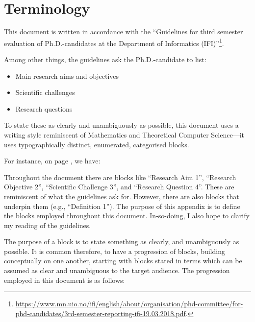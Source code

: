 \section{Terminology}\label{app:terminology}

This document is written in accordance with the ``Guidelines for third
semester evaluation of Ph.D.-candidates at the Department of
Informatics
(IFI)''\footnote{\url{https://www.mn.uio.no/ifi/english/about/organisation/phd-committee/for-phd-candidates/3rd-semester-reporting-ifi-19.03.2018.pdf}.}.

Among other things, the guidelines ask the Ph.D.-candidate to list:

\begin{itemize}

\item Main research aims and objectives

\item Scientific challenges

\item Research questions

\end{itemize}

To state these as clearly and unambiguously as possible, this document
uses a writing style reminiscent of Mathematics and Theoretical
Computer Science---it uses typographically distinct, enumerated,
categorised blocks.

For instance, on page \pageref{research-aim}, we have:

\setcounter{research-aim}{0}

\researchAim{}

Throughout the document there are blocks like ``Research Aim 1'',
``Research Objective 2'', ``Scientific Challenge 3'', and ``Research
Question 4''. These are reminiscent of what the guidelines ask for.
However, there are also blocks that underpin them (e.g., ``Definition
1''). The purpose of this appendix is to define the blocks employed
throughout this document. In-so-doing, I also hope to clarify my
reading of the guidelines.

\bigskip

The purpose of a block is to state something as clearly, and
unambiguously as possible. It is common therefore, to have a
progression of blocks, building conceptually on one another, starting
with blocks stated in terms which can be assumed as clear and
unambiguous to the target audience. The progression employed in this
document is as follows:

